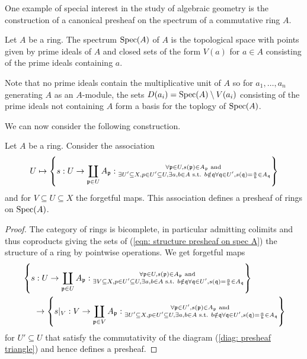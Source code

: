 One example of special interest in the study of algebraic geometry is the construction of a canonical presheaf on the spectrum of a commutative ring $A$. 
\begin{definition}\label{def: spectrum of a ring}
    Let $A$ be a ring. The spectrum $\operatorname{Spec}(A)$ of $A$ is the topological space with points given by prime ideals of $A$ and closed sets of the form $V(a)$ for $a\in A$ consisting of the prime ideals containing $a$. 
\end{definition}
Note that no prime ideals contain the multiplicative unit of $A$ so for $a_{1},\dots,a_{n}$ generating $A$ as an $A$-module, the sets $D(a_{i})=\operatorname{Spec}(A)\setminus V(a_{i})$ consisting of the prime ideals not containing $A$ form a basis for the toplogy of $\operatorname{Spec}(A)$. 

We can now consider the following construction. 
\begin{proposition}\label{prop: structure presheaf on spec A}
    Let $A$ be a ring. Consider the association
    \begin{equation}\label{eqn: structure presheaf on spec A}
        U\mapsto \left\{s:U\to\coprod_{\mathfrak{p}\in U}A_{\mathfrak{p}}:\substack{\forall\mathfrak{p}\in U, s(\mathfrak{p})\in A_{\mathfrak{p}} \text{ and } \\ \exists U'\subseteq X, p\in U'\subseteq U, \exists a,b\in A \text{ s.t. }b\notin\mathfrak{q} \forall\mathfrak{q}\in U', s(\mathfrak{q})=\frac{a}{b}\in A_{\mathfrak{q}}}\right\}
    \end{equation}
    and for $V\subseteq U\subseteq X$ the forgetful maps. This association defines a presheaf of rings on $\operatorname{Spec}(A)$.
\end{proposition}
\begin{proof}
    The category of rings is bicomplete, in particular admitting colimits and thus coproducts giving the sets of (\ref{eqn: structure presheaf on spec A}) the structure of a ring by pointwise operations. We get forgetful maps 
    \begin{align*}
        &\left\{s:U\to\coprod_{\mathfrak{p}\in U}A_{\mathfrak{p}}:\substack{\forall\mathfrak{p}\in U, s(\mathfrak{p})\in A_{\mathfrak{p}} \text{ and } \\ \exists V\subseteq X, p\in U'\subseteq U, \exists a,b\in A \text{ s.t. }b\notin\mathfrak{q} \forall\mathfrak{q}\in U', s(\mathfrak{q})=\frac{a}{b}\in A_{\mathfrak{q}}}\right\} \\
        &\hspace{0.5cm}\to\left\{s|_{V}:V\to\coprod_{\mathfrak{p}\in V}A_{\mathfrak{p}}:\substack{\forall\mathfrak{p}\in U', s(\mathfrak{p})\in A_{\mathfrak{p}} \text{ and } \\ \exists U'\subseteq X, p\in U'\subseteq U, \exists a,b\in A \text{ s.t. }b\notin\mathfrak{q} \forall\mathfrak{q}\in U', s(\mathfrak{q})=\frac{a}{b}\in A_{\mathfrak{q}}}\right\}
    \end{align*}
    for $U'\subseteq U$ that satisfy the commutativity of the diagram (\ref{diag: presheaf triangle}) and hence defines a presheaf. 
\end{proof}
